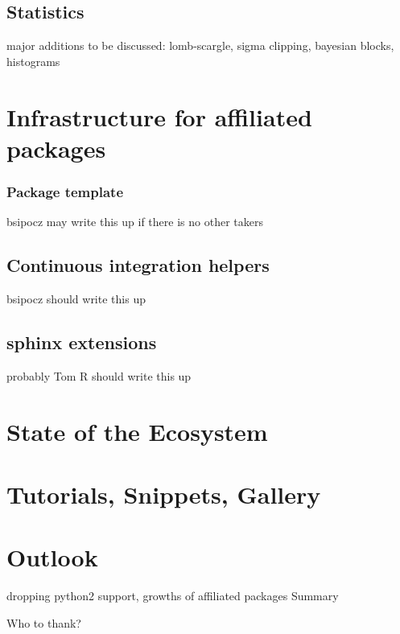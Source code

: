 \documentclass[modern]{aastex61}
\begin{document}
\subsection{Statistics}


major additions to be discussed: lomb-scargle, sigma clipping, bayesian blocks, histograms

\section{Infrastructure for affiliated packages}
\subsubsection{Package template}
bsipocz may write this up if there is no other takers
\subsection{Continuous integration helpers}
bsipocz should write this up
\subsection{sphinx extensions}
probably Tom R should write this up
\section{State of the Ecosystem}

\section{Tutorials, Snippets, Gallery}

\section{Outlook}
dropping python2 support, growths of affiliated packages
Summary

\acknowledgments

Who to thank?



%
%

\begin{thebibliography}{}

\end{thebibliography}
\end{document}
